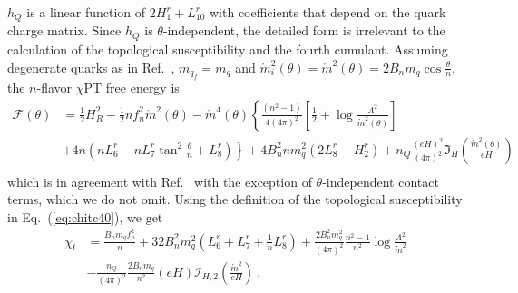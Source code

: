 \documentclass[12pt]{elsarticle}
\begin{document}
$h_{Q}$ is a linear function of $2H_{1}^{r}+L^{r}_{10}$ with coefficients that depend on the quark charge matrix. Since $h_{Q}$ is $\theta$-independent, the detailed form is irrelevant to the calculation of the topological susceptibility and the fourth cumulant. Assuming degenerate quarks as in Ref.~\cite{Guo:2015oxa}, $m_{q_{f}}=m_{q}$ and $\mathring{m}_{i}^{2}(\theta)=\mathring{m}^{2}(\theta)=2B_{n}m_{q}\cos\frac{\theta}{n}$, the $n$-flavor $\chi$PT free energy is
\begin{equation}
\begin{split}
\mathcal{F}(\theta)&=\frac{1}{2}H_{R}^{2}-\frac{1}{2}nf_{n}^{2}\mathring{m}^{2}(\theta)-\mathring{m}^{4}(\theta)\left\{\frac{(n^{2}-1)}{4(4\pi)^{2}}\left[\frac{1}{2}+\log\frac{\Lambda^{2}}{\mathring{m}^{2}(\theta)} \right ]\right.\\
&\left.+4n\left(nL^{r}_{6}-nL^{r}_{7}\tan^{2}\tfrac{\theta}{n}+L^{r}_{8}\right)\right\}+4B_{n}^{2}nm_{q}^{2}(2L^{r}_{8}-H^{r}_{2})+n_{Q}\frac{(eH)^{2}}{(4\pi)^{2}}\mathfrak{I}_{H}(\tfrac{\mathring{m}^{2}(\theta)}{eH})\\
\end{split}
\end{equation}
which is in agreement with Ref.~\cite{Guo:2015oxa} with the exception of $\theta$-independent contact terms, which we do not omit.
Using the definition of the topological susceptibility in Eq.~(\ref{eq:chitc40}), we get
\begin{equation}
\begin{split}
\label{eq:chit-nf}
\chi_{t}&=\frac{B_{n}m_{q}f_{n}^{2}}{n}+32B_{n}^{2}m_{q}^{2}(L^{r}_{6}+L^{r}_{7}+\tfrac{1}{n}L^{r}_{8})+\frac{2B_{n}^{2}m_{q}^{2}}{(4\pi)^{2}}\frac{n^{2}-1}{n^{2}}\log\frac{\Lambda^{2}}{\mathring{m}^{2}}\\
&-\frac{n_{Q}}{(4\pi)^{2}}\frac{2B_{n}m_{q}}{n^{2}}(eH) \mathcal{I}_{H,2}(\tfrac{\mathring{m}^{2}}{eH})\ ,
\end{split}
\end{equation}
\end{document}
